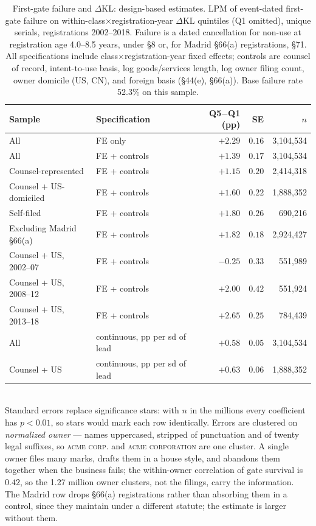 \documentclass[11pt]{article}
\newcommand{\dkl}{$\Delta$KL}
\begin{document}
\begin{table}[h]\centering\small
\caption{First-gate failure and \dkl{}: design-based estimates.
LPM of event-dated first-gate failure on within-class$\times$registration-year
\dkl{} quintiles (Q1 omitted), unique serials, registrations 2002--2018.
Failure is a dated cancellation for non-use at registration age 4.0--8.5
years, under \S8 or, for Madrid \S66(a) registrations, \S71.
All specifications include class$\times$registration-year fixed effects; controls
are counsel of record, intent-to-use basis, log goods/services length,
log owner filing count, owner domicile (US, CN), and foreign basis
(\S44(e), \S66(a)). Base failure rate 52.3\% on this sample.}
\label{tab:gate_lpm}
\begin{tabular}{llrrr}
\toprule
Sample & Specification & Q5$-$Q1 (pp) & SE & $n$ \\
\midrule
All & FE only & $+2.29$ & $0.16$ & 3{,}104{,}534 \\
All & FE + controls & $+1.39$ & $0.17$ & 3{,}104{,}534 \\
Counsel-represented & FE + controls & $+1.15$ & $0.20$ & 2{,}414{,}318 \\
Counsel + US-domiciled & FE + controls & $+1.60$ & $0.22$ & 1{,}888{,}352 \\
Self-filed & FE + controls & $+1.80$ & $0.26$ & 690{,}216 \\
Excluding Madrid \S66(a) & FE + controls & $+1.82$ & $0.18$ & 2{,}924{,}427 \\
\midrule
Counsel + US, 2002--07 & FE + controls & $-0.25$ & $0.33$ & 551{,}989 \\
Counsel + US, 2008--12 & FE + controls & $+2.00$ & $0.42$ & 551{,}924 \\
Counsel + US, 2013--18 & FE + controls & $+2.65$ & $0.25$ & 784{,}439 \\
\midrule
All & continuous, pp per sd of lead & $+0.58$ & $0.05$ & 3{,}104{,}534 \\
Counsel + US & continuous, pp per sd of lead & $+0.63$ & $0.06$ & 1{,}888{,}352 \\
\bottomrule
\end{tabular}
\\[0.3em]\footnotesize Standard errors replace significance stars: with $n$
in the millions every coefficient has $p < 0.01$, so stars would mark each
row identically. Errors are clustered on \emph{normalized owner} --- names
uppercased, stripped of punctuation and of twenty legal suffixes, so
\textsc{acme corp.} and \textsc{acme corporation} are one cluster. A single
owner files many marks, drafts them in a house style, and abandons them
together when the business fails; the within-owner correlation of gate
survival is $0.42$, so the 1.27 million owner clusters, not the filings,
carry the information. The Madrid row drops \S66(a) registrations rather
than absorbing them in a control, since they maintain under a different
statute; the estimate is larger without them.
\end{table}
\end{document}
